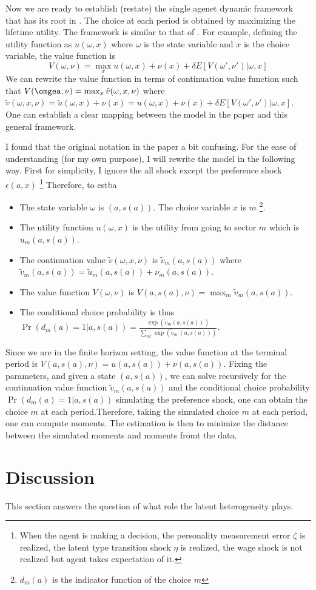 \documentclass[12pt]{article}
\begin{document}
Now we are ready to establish (restate) the single agenet dynamic framework that has its root in \cite{rust}.
The choice at each period is obtained by maximizing the lifetime utility. The framework is similar to that of \cite{rust}.
For example, defining the utility function as $u(\omega,x)$ where $\omega$ is the state variable and $x$ is the choice variable, the value function is
$$V(\omega,\nu) = \max_x u(\omega,x) + \nu(x)+\delta E[V(\omega',\nu')|\omega,x]$$
We can rewrite the value function in terms of continuation value function such that $V(\omgea,\nu)=\max_x \tilde{v}(\omega,x,\nu)$ where $\tilde{v}(\omega,x,\nu)=\tilde{u}(\omega,x)+\nu(x)= u(\omega,x)+\nu(x)+\delta E[V(\omega',\nu')|\omega,x]$. 
One can establish a clear mapping between the model in the paper and this general framework. 

I found that the original notation in the paper a bit confusing. For the ease of understanding (for my own purpose), I will rewrite the model in the following way.
First for simplicity, I ignore the all shock except the preference shock $\epsilon(a,x)$ \footnote{When the agent is making a decision, the personality measurement error $\zeta$ is realized, the latent type transition shock $\eta$ is realized, the wage shock is not realized but agent takes expectation of it.} Therefore, to estba
\begin{itemize}
    \item The state variable $\omega$ is $(a,s(a))$. The choice variable $x$ is $m$ \footnote{$d_m(a)$ is the indicator function of the choice $m$}.
    \item The utility function $u(\omega,x)$ is the utility from going to sector $m$ which is $u_m(a,s(a))$.
    \item The continuation value $\tilde{v}(\omega,x,\nu)$ is $\tilde{v}_m(a,s(a))$ where $\tilde{v}_m(a,s(a)) = \tilde{u}_m(a,s(a)) + \nu_m(a,s(a))$.
    \item The value function $V(\omega,\nu)$ is $V(a,s(a),\nu) = \max_m \tilde{v}_m(a,s(a))$.
    \item The conditional choice probability is thus $\Pr(d_m(a)=1|a,s(a))=\frac{\exp(\tilde{v}_m(a,s(a)))}{\sum_{m'}\exp(\tilde{v}_{m'}(a,s(a)))}$.
\end{itemize}
Since we are in the finite horizon setting, the value function at the terminal period is $V(a,s(a),\nu) = u(a,s(a))+\nu(a,s(a))$. Fixing the parameters, and given a state $(a,s(a))$, we can solve recursively for the continuation value function $\tilde{v}_m(a,s(a))$ and the conditional choice probability $\Pr(d_m(a)=1|a,s(a))$ simulating the preference shock, one can obtain the choice $m$ at each period.Therefore, taking the simulated choice $m$ at each period, one can compute moments. The estimation is then to minimize the distance between the simulated moments and moments fromt the data.




\section{Discussion}
This section answers the question of what role the latent heterogeneity plays.

\pagebreak \newpage 
\end{document}
